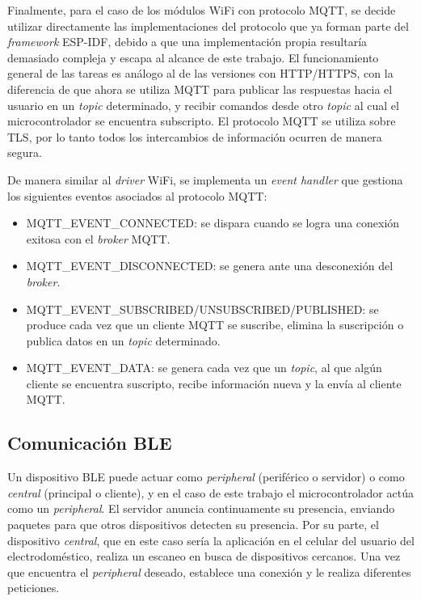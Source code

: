 Finalmente, para el caso de los módulos WiFi con protocolo MQTT, se decide utilizar directamente las implementaciones del protocolo que ya forman parte del \emph{framework} ESP-IDF, debido a que una implementación propia resultaría demasiado compleja y escapa al alcance de este trabajo. El funcionamiento general de las tareas es análogo al de las versiones con HTTP/HTTPS, con la diferencia de que ahora se utiliza MQTT para publicar las respuestas hacia el usuario en un \emph{topic} determinado, y recibir comandos desde otro \emph{topic} al cual el microcontrolador se encuentra subscripto. El protocolo MQTT se utiliza sobre TLS, por lo tanto todos los intercambios de información ocurren de manera segura.

De manera similar al \emph{driver} WiFi, se implementa un \emph{event handler} que gestiona los siguientes eventos asociados al protocolo MQTT:

\begin{itemize}
	\item MQTT\_EVENT\_CONNECTED: se dispara cuando se logra una conexión exitosa con el \emph{broker} MQTT.
	\item MQTT\_EVENT\_DISCONNECTED: se genera ante una desconexión del \emph{broker}.
	\item MQTT\_EVENT\_SUBSCRIBED/UNSUBSCRIBED/PUBLISHED: se produce cada vez que un cliente MQTT se suscribe, elimina la suscripción o publica datos en un \emph{topic} determinado.
	\item MQTT\_EVENT\_DATA: se genera cada vez que un \emph{topic}, al que algún cliente se encuentra suscripto, recibe información nueva y la envía al cliente MQTT.
\end{itemize} 



\subsection{Comunicación BLE}

Un dispositivo BLE puede actuar como \emph{peripheral} (periférico o servidor) o como \emph{central} (principal o cliente), y en el caso de este trabajo el microcontrolador actúa como un \emph{peripheral}. El servidor anuncia continuamente su presencia, enviando paquetes para que otros dispositivos detecten su presencia. Por su parte, el dispositivo \emph{central}, que en este caso sería la aplicación en el celular del usuario del electrodoméstico, realiza un escaneo en busca de dispositivos cercanos. Una vez que encuentra el \emph{peripheral} deseado, establece una conexión y le realiza diferentes peticiones.

